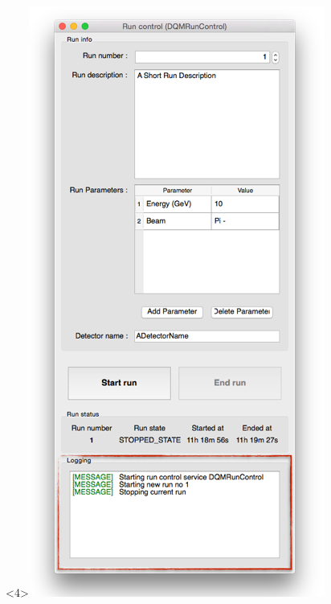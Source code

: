 \documentclass[8pt]{beamer}
\begin{document}
\begin{frame}
\begin{center}
\begin{overlayarea}{\textwidth}{\textheight}
\begin{columns}
\begin{center}
          \begin{onlyenv}<4>\includegraphics[width=\textwidth]{figs/RunControl/RunControl_logging.png}\end{onlyenv}
        \end{center}

\end{columns}
\end{overlayarea}
\end{center}
\end{frame}
\end{document}
